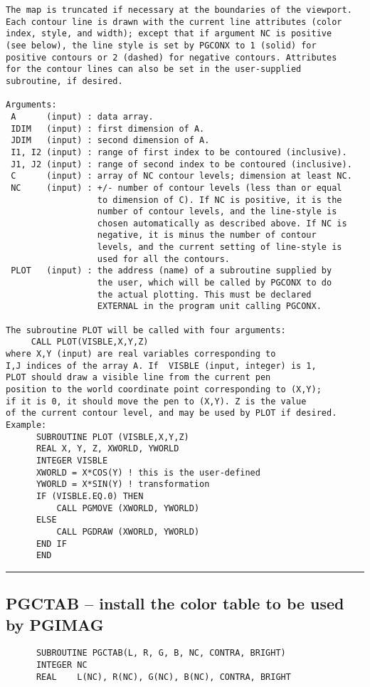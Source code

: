 {\begin{verbatim}
The map is truncated if necessary at the boundaries of the viewport.
Each contour line is drawn with the current line attributes (color
index, style, and width); except that if argument NC is positive
(see below), the line style is set by PGCONX to 1 (solid) for
positive contours or 2 (dashed) for negative contours. Attributes
for the contour lines can also be set in the user-supplied
subroutine, if desired.

Arguments:
 A      (input) : data array.
 IDIM   (input) : first dimension of A.
 JDIM   (input) : second dimension of A.
 I1, I2 (input) : range of first index to be contoured (inclusive).
 J1, J2 (input) : range of second index to be contoured (inclusive).
 C      (input) : array of NC contour levels; dimension at least NC.
 NC     (input) : +/- number of contour levels (less than or equal
                  to dimension of C). If NC is positive, it is the
                  number of contour levels, and the line-style is
                  chosen automatically as described above. If NC is
                  negative, it is minus the number of contour
                  levels, and the current setting of line-style is
                  used for all the contours.
 PLOT   (input) : the address (name) of a subroutine supplied by
                  the user, which will be called by PGCONX to do
                  the actual plotting. This must be declared
                  EXTERNAL in the program unit calling PGCONX.

The subroutine PLOT will be called with four arguments:
     CALL PLOT(VISBLE,X,Y,Z)
where X,Y (input) are real variables corresponding to
I,J indices of the array A. If  VISBLE (input, integer) is 1,
PLOT should draw a visible line from the current pen
position to the world coordinate point corresponding to (X,Y);
if it is 0, it should move the pen to (X,Y). Z is the value
of the current contour level, and may be used by PLOT if desired.
Example:
      SUBROUTINE PLOT (VISBLE,X,Y,Z)
      REAL X, Y, Z, XWORLD, YWORLD
      INTEGER VISBLE
      XWORLD = X*COS(Y) ! this is the user-defined
      YWORLD = X*SIN(Y) ! transformation
      IF (VISBLE.EQ.0) THEN
          CALL PGMOVE (XWORLD, YWORLD)
      ELSE
          CALL PGDRAW (XWORLD, YWORLD)
      END IF
      END
\end{verbatim}
\hrule


\subsection*{PGCTAB -- install the color table to be used by PGIMAG }
\begin{verbatim}
      SUBROUTINE PGCTAB(L, R, G, B, NC, CONTRA, BRIGHT)
      INTEGER NC
      REAL    L(NC), R(NC), G(NC), B(NC), CONTRA, BRIGHT


\end{verbatim}}
